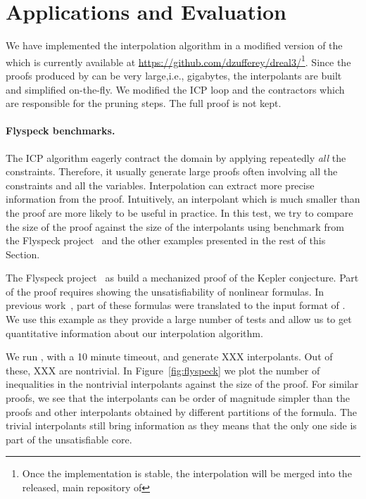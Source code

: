 \section{Applications and Evaluation}
\label{sec:eval}

We have implemented the interpolation algorithm in a modified version of the \dReal which is currently available at \url{https://github.com/dzufferey/dreal3/}\footnote{Once the implementation is stable, the interpolation will be merged into the released, main repository of \dReal}.
Since the proofs produced by \dReal can be very large,i.e., gigabytes, the interpolants are built and simplified on-the-fly.
We modified the ICP loop and the contractors which are responsible for the pruning steps.
The full proof is not kept.

\paragraph{Flyspeck benchmarks.}
The ICP algorithm eagerly contract the domain by applying repeatedly \emph{all} the constraints. Therefore, it usually generate large proofs often involving all the constraints and all the variables.
Interpolation can extract more precise information from the proof.
Intuitively, an interpolant which is much smaller than the proof are more likely to be useful in practice.
In this test, we try to compare the size of the proof against the size of the interpolants using benchmark from the Flyspeck project~\cite{???} and the other examples presented in the rest of this Section.

The Flyspeck project~\cite{???} as build a mechanized proof of the Kepler conjecture.
Part of the proof requires showing the unsatisfiability of nonlinear formulas.
In previous work~\cite{???}, part of these formulas were translated to the input format of \dReal.
We use this example as they provide a large number of tests and allow us to get quantitative information about our interpolation algorithm.

We run \dReal, with a 10 minute timeout, and generate XXX interpolants.
Out of these, XXX are nontrivial.
In Figure~\ref{fig:flyspeck} we plot the number of inequalities in the nontrivial interpolants against the size of the proof.
For similar proofs, we see that the interpolants can be order of magnitude simpler than the proofs and other interpolants obtained by different partitions of the formula.
The trivial interpolants still bring information as they means that the only one side is part of the unsatisfiable core.


